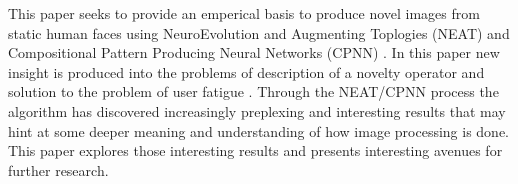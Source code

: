 This paper seeks to provide an emperical basis to produce novel images from static human faces
using NeuroEvolution and Augmenting Toplogies (NEAT) \cite{stanley2002evolving} and Compositional Pattern Producing Neural Networks (CPNN) \cite{stanley2007compositional}. 
In this paper new insight is produced into the problems of description of a novelty operator \cite{lehman2010efficiently} and solution to
the problem of user fatigue \cite{secretan2008picbreeder}. Through the NEAT/CPNN process the algorithm has discovered increasingly
preplexing and interesting results that may hint at some deeper meaning and understanding of how image processing is done. This paper
explores those interesting results and presents interesting avenues for further research. 